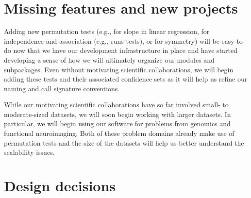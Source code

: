 %
%
%
%
%
%
%
%
%
%
%
%
%
%
%
%

\section{Missing features and new projects}


Adding new permutation tests (e.g., for slope in linear regression, for
independence and association (e.g., runs tests), or for symmetry) will be easy to
do now that we have our development infrastructure in place and have started
developing a sense of how we will ultimately organize our modules and
subpackages.  Even without motivating scientific collaborations, we will begin
adding these tests and their associated confidence sets as it will help us
refine our naming and call signature conventions.

While our motivating scientific collaborations have so far involved small- to
moderate-sized datasets, we will soon begin working with larger datasets.  In
particular, we will begin using our software for problems from
genomics and functional neuroimaging.  Both of these problem domains already
make use of permutation tests and the size of the datasets will help us
better understand the scalability issues.

\section{Design decisions}

